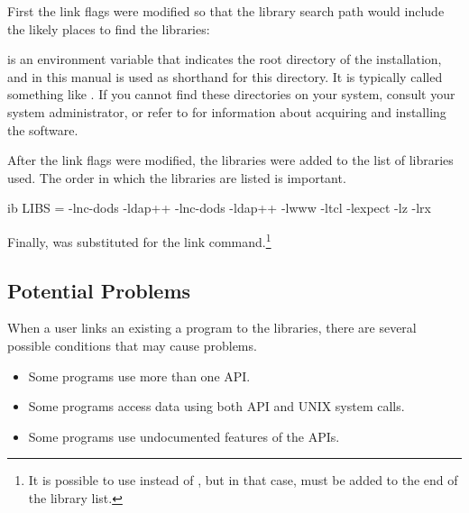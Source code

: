 First the link flags were modified so that the library search path
would include the likely places to find the \opendap libraries:


%
%
%
%

 is an environment variable that indicates the root
directory of the \opendap installation, and in this manual is used as
shorthand for this directory.  It is typically called something like
. If you cannot find these directories on your
system, consult your system administrator, or refer to
 for information about acquiring and installing
the \opendap software.

After the link flags were modified, the \opendap libraries were added to the list
of libraries used. The order in which the libraries are listed is important.

\begin{vcode}{ib}
LIBS = -lnc-dods -ldap++ -lnc-dods -ldap++ -lwww -ltcl 
       -lexpect -lz -lrx
\end{vcode}


Finally,  was substituted for the link command.\footnote{It
  is possible to use  instead of , but in that
  case,  must be added to the end of the library list.}


\subsection{Potential Problems}

  
When a user links an existing a program to the \opendap libraries, there are
several possible conditions that may cause problems.

\begin{itemize}
\item Some programs use more than one API.

\item Some programs access data using both API and UNIX system calls.

\item Some programs use undocumented features of the APIs.

\end{itemize}

